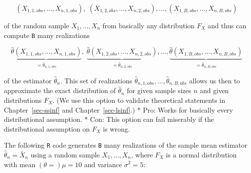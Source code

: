 \documentclass[
  letterpaper,
  DIV=11,
  numbers=noendperiod]{scrreprt}
\theoremstyle{definition}
\theoremstyle{plain}
\theoremstyle{plain}
\theoremstyle{remark}
\begin{document}
\[
(X_{1,1,obs},\dots,X_{n,1,obs}),\; (X_{1,2,obs},\dots,X_{n,2,obs}),\dots, (X_{1,B,obs},\dots,X_{n,B,obs})
\]

of the random sample \(X_{1},\dots,X_{n}\) from basically any
distribution \(F_X\) and thus can compute \texttt{B} many realizations

\[
\underbrace{\hat\theta(X_{1,1,obs},\dots,X_{n,1,obs})}_{=\hat\theta_{n,1,obs}},\;\underbrace{\hat\theta(X_{1,2,obs},\dots,X_{n,2,obs})}_{=\hat\theta_{n,2,obs}},\dots,\underbrace{\hat\theta(X_{1,B,obs},\dots,X_{n,B,obs})}_{=\hat\theta_{n,B,obs}}
\]

of the estimator \(\hat\theta_n\). This set of realizations
\(\hat\theta_{n,1,obs},\dots,\hat\theta_{n,B,obs}\) allows us then to
approximate the exact distribution of \(\hat\theta_n\) for given sample
sizes \(n\) and given distributions \(F_X\). (We use this option to
validate theoretical statements in Chapter~\ref{sec-ssinf} and
Chapter~\ref{sec-lsinf}.) * Pro: Works for basically every
distributional assumption. * Con: This option can fail miserably if the
distributional assumption on \(F_X\) is wrong.

The following \texttt{R} code generates \texttt{B} many realizations of
the sample mean estimator \(\hat\theta_n=\bar{X}_n\) using a random
sample \(X_1,\dots,X_n\), where \(F_X\) is a normal distribution with
mean \((\theta=)\mu=10\) and variance \(\sigma^2=5\):
\end{document}
